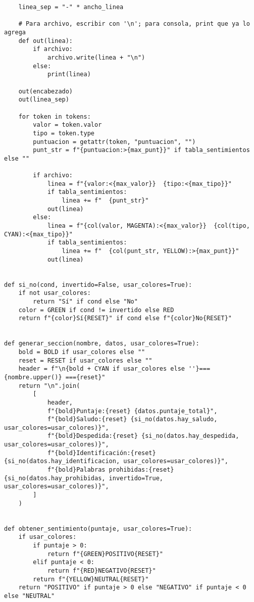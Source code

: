 \begin{lstlisting}
    linea_sep = "-" * ancho_linea

    # Para archivo, escribir con '\n'; para consola, print que ya lo agrega
    def out(linea):
        if archivo:
            archivo.write(linea + "\n")
        else:
            print(linea)

    out(encabezado)
    out(linea_sep)

    for token in tokens:
        valor = token.valor
        tipo = token.type
        puntuacion = getattr(token, "puntuacion", "")
        punt_str = f"{puntuacion:>{max_punt}}" if tabla_sentimientos else ""

        if archivo:
            linea = f"{valor:<{max_valor}}  {tipo:<{max_tipo}}"
            if tabla_sentimientos:
                linea += f"  {punt_str}"
            out(linea)
        else:
            linea = f"{col(valor, MAGENTA):<{max_valor}}  {col(tipo, CYAN):<{max_tipo}}"
            if tabla_sentimientos:
                linea += f"  {col(punt_str, YELLOW):>{max_punt}}"
            out(linea)


def si_no(cond, invertido=False, usar_colores=True):
    if not usar_colores:
        return "Sí" if cond else "No"
    color = GREEN if cond != invertido else RED
    return f"{color}Sí{RESET}" if cond else f"{color}No{RESET}"


def generar_seccion(nombre, datos, usar_colores=True):
    bold = BOLD if usar_colores else ""
    reset = RESET if usar_colores else ""
    header = f"\n{bold + CYAN if usar_colores else ''}=== {nombre.upper()} ==={reset}"
    return "\n".join(
        [
            header,
            f"{bold}Puntaje:{reset} {datos.puntaje_total}",
            f"{bold}Saludo:{reset} {si_no(datos.hay_saludo, usar_colores=usar_colores)}",
            f"{bold}Despedida:{reset} {si_no(datos.hay_despedida, usar_colores=usar_colores)}",
            f"{bold}Identificación:{reset} {si_no(datos.hay_identificacion, usar_colores=usar_colores)}",
            f"{bold}Palabras prohibidas:{reset} {si_no(datos.hay_prohibidas, invertido=True, usar_colores=usar_colores)}",
        ]
    )


def obtener_sentimiento(puntaje, usar_colores=True):
    if usar_colores:
        if puntaje > 0:
            return f"{GREEN}POSITIVO{RESET}"
        elif puntaje < 0:
            return f"{RED}NEGATIVO{RESET}"
        return f"{YELLOW}NEUTRAL{RESET}"
    return "POSITIVO" if puntaje > 0 else "NEGATIVO" if puntaje < 0 else "NEUTRAL"



\end{lstlisting}
